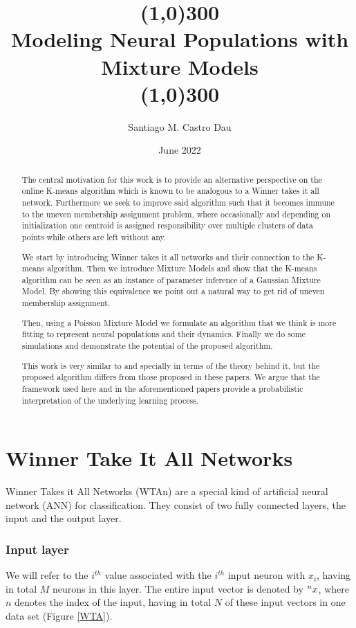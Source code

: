\documentclass{article}
\title{\color{draculafg}\line(1,0){300}\\Modeling Neural Populations with Mixture Models\\\line(1,0){300}}
\author{\color{draculafg}Santiago M. Castro Dau}
\affil{Semester project for the Cortical Computation Group, \\
	   Institute of Neuroinformatics,\\ University of Zürich and ETH Zürich}
\date{\color{draculafg}June 2022}
\begin{document}
\maketitle
 
\begin{abstract}
The central motivation for this work is to provide an alternative perspective on the
online K-means algorithm which is known to be analogous to a Winner takes it all
network. Furthermore we seek to improve said algorithm such that it becomes immune to the uneven
membership assignment problem, where occasionally and depending on
initialization one centroid is assigned responsibility over multiple
clusters of data points while others are left without any.
 
We start by introducing Winner takes it all networks and their connection to the K-means algorithm. Then we introduce Mixture Models and show that the K-means algorithm can be seen as an instance of parameter inference of a Gaussian Mixture Model. By showing this equivalence we point out a natural way to get rid of uneven
membership assignment.
 
Then, using
a Poisson Mixture Model we formulate an algorithm that we think is more fitting to represent neural populations and their dynamics. Finally we do some simulations and demonstrate the potential of the proposed algorithm.
 
This work is very similar to \cite{Moraitis2021} and \cite{Keck2012} specially in terms of the theory
behind it, but the proposed algorithm differs from those proposed in
these papers. We argue that the framework used here and in the aforementioned papers provide a
probabilistic interpretation of the underlying learning process.
 
\end{abstract}
 
\pagebreak
 
\tableofcontents
 
\pagebreak
 
\section{Winner Take It All Networks}
Winner Takes it All Networks (WTAn) are a special kind of artificial neural network (ANN) for classification. They consist of two fully connected layers, the input and the output layer.
 
\subsubsection*{Input layer}
We will refer to the \(i^{th}\) value associated with the \(i^{th}\) input neuron with \(x_i\), having in total \(M\) neurons in this layer. The entire input vector is denoted by \(\prescript{n}{}{x}\), where \(n\) denotes the index of the input, having in total \(N\) of these input vectors in one data set (Figure \ref{WTA}).
 
\end{document}
